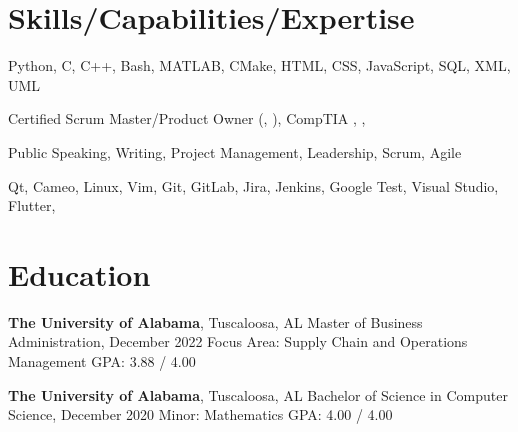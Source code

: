 \documentclass[hidelinks, 11pt]{article}
\begin{document}
\makecvtitle
\vspace{0.5mm}

\section{Skills/Capabilities/Expertise}

\begin{description}[widest=Programming Langauges:]
	\item[Programming Languages\normalfont:] Python, C, C++, Bash, MATLAB, CMake, HTML, CSS, JavaScript, SQL, XML, UML
	\item[Certifications\normalfont:] Certified Scrum Master/Product Owner (, ), CompTIA , , 
	\item[Soft Skills\normalfont:] Public Speaking, Writing, Project Management, Leadership, Scrum, Agile
	\item[Tools\normalfont:] Qt, Cameo, Linux, Vim, Git, GitLab, Jira, Jenkins, Google Test, Visual Studio, Flutter, 
\end{description}

\section{Education}
\begin{multicols}{2}
	\begin{minipage}{0.5\textwidth}
		\textbf{The University of Alabama}, Tuscaloosa, AL \newline
		Master of Business Administration, December 2022 \newline
		Focus Area: Supply Chain and Operations Management \newline
		GPA: 3.88 / 4.00
	\end{minipage}
	\begin{minipage}{0.5\textwidth}
		\textbf{The University of Alabama}, Tuscaloosa, AL \newline
		Bachelor of Science in Computer Science, December 2020 \newline
		Minor: Mathematics \newline
		GPA: 4.00 / 4.00
	\end{minipage}
\end{multicols}
\end{document}
